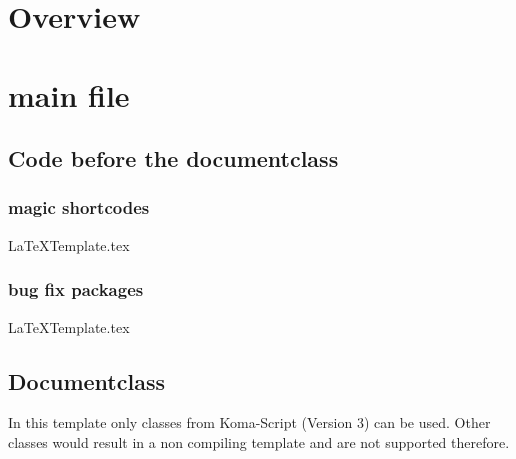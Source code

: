 \let\oldlatex\latex
\renewcommand{\latex}{\oldlatex\xspace}
\newcommand{\file}[1]{\texttt{#1}}

\setcounter{lstLastLine}{0}
\setcounter{lstLastPage}{0}
\newcommand{\printCodeFromFile}[3][]
{
\ifstrempty{#1}{}{%
  \setcounter{lstLastPage}{#1}
}
\setcounter{lstLastLine}{#2}
%
%
  {#3}%
%
\setcounter{lstLastPage}{#2}
\addtocounter{lstLastPage}{1}
}

\chapter{Overview}

\chapter{main file}

\section{Code before the documentclass}

\subsection{magic shortcodes}
\printCodeFromFile{1}{LaTeXTemplate.tex}

\subsection{bug fix packages}
\printCodeFromFile[3]{6}{LaTeXTemplate.tex}

\section{Documentclass}
In this template only classes from Koma-Script (Version 3) can be used.
Other classes would result in a non compiling template and are not supported therefore. 

